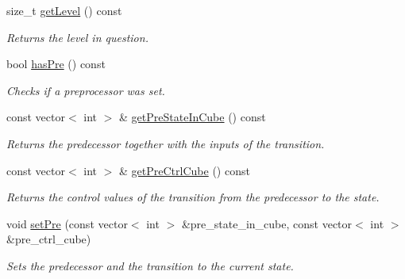\begin{DoxyCompactItemize}
size\-\_\-t \hyperlink{classIFMProofObligation_acf55ebc5c8e1720d770c99e76fb02ec5}{get\-Level} () const 
\begin{DoxyCompactList}\small\item\em Returns the level in question. \end{DoxyCompactList}\item 
bool \hyperlink{classIFMProofObligation_ad8175e23cff3378d2feb7c5bae2c171f}{has\-Pre} () const 
\begin{DoxyCompactList}\small\item\em Checks if a preprocessor was set. \end{DoxyCompactList}\item 
const vector$<$ int $>$ \& \hyperlink{classIFMProofObligation_ab9c20d91b552ef862c37837b9d707895}{get\-Pre\-State\-In\-Cube} () const 
\begin{DoxyCompactList}\small\item\em Returns the predecessor together with the inputs of the transition. \end{DoxyCompactList}\item 
const vector$<$ int $>$ \& \hyperlink{classIFMProofObligation_a577815e5d3e6205c0c3b09934489100e}{get\-Pre\-Ctrl\-Cube} () const 
\begin{DoxyCompactList}\small\item\em Returns the control values of the transition from the predecessor to the state. \end{DoxyCompactList}\item 
void \hyperlink{classIFMProofObligation_a3bca5075c133d0717af164407c2403ae}{set\-Pre} (const vector$<$ int $>$ \&pre\-\_\-state\-\_\-in\-\_\-cube, const vector$<$ int $>$ \&pre\-\_\-ctrl\-\_\-cube)
\begin{DoxyCompactList}\small\item\em Sets the predecessor and the transition to the current state. \end{DoxyCompactList}\end{DoxyCompactItemize}
